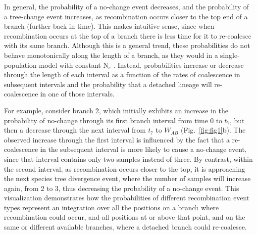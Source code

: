 \documentclass[11pt]{article}
\begin{document}
In general, the probability of a no-change event decreases, and the probability
of a tree-change event increases, as recombination occurs closer to the top
end of a branch (further back in time). This makes intuitive sense, since when 
recombination occurs at the top of a branch there is less time for it to re-coalesce 
with its same branch. Although this is a general trend, these probabilities do not 
behave monotonically along the length of a branch, as they would in a 
single-population model with constant N$_e$ \citep{deng_distribution_2021}.
Instead, probabilities increase or decrease through the length of each
interval as a function of the rates of coalescence in subsequent 
intervals and the probability that a detached lineage will 
re-coalescence in one of those intervals.

For example, consider branch 2, which initially exhibits an increase in the
probability of no-change through its first branch interval from time 0 to
$t_7$, but then a decrease through the next interval from $t_7$ to $W_{AB}$
(Fig.~\ref{fig:fig1}b).
The observed increase through the first interval is influenced by the fact that
a re-coalescence in the subsequent interval is more likely to cause a no-change
event, since that interval contains only two samples instead of three.
By contrast, within the second interval, as recombination occurs closer to 
the top, it is approaching the next species tree divergence event, where the 
number of samples will increase again, from 2 to 3, 
thus decreasing the probability of a no-change event. 
This visualization demonstrates how the probabilities of different recombination 
event types represent an integration over all the positions on a branch where 
recombination could occur, and all positions at or above that point, and on the 
same or different available branches, where a detached branch could re-coalesce. 

\end{document}
